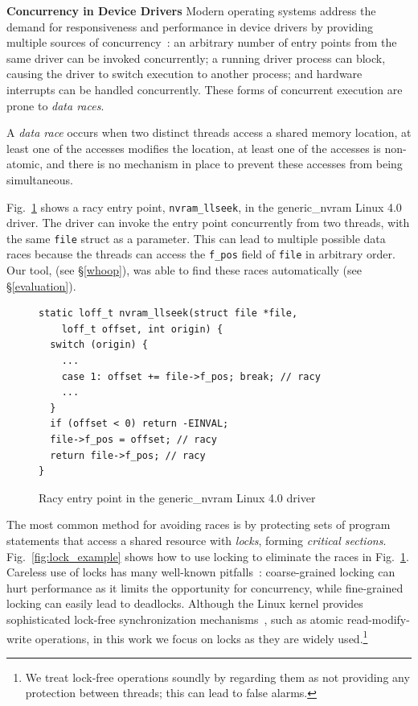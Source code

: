 \noindent\textbf{Concurrency in Device Drivers }
%
Modern operating systems address the demand for responsiveness and performance in device drivers by providing multiple sources of concurrency~\cite{corbet2005linux}: an arbitrary number of entry points from the same driver can be invoked concurrently; a running driver process can block, causing the driver to switch execution to another process; and hardware interrupts can be handled concurrently.  These forms of concurrent execution are prone to \emph{data races}.

\begin{definition}
\label{definition:datarace}
A \emph{data race} occurs when two distinct threads access a shared memory location, at least one of the accesses modifies the location, at least one of the accesses is non-atomic, and there is no mechanism in place to prevent these accesses from being simultaneous.
\end{definition}

Fig.~\ref{fig:data_race_example} shows a racy entry point, \texttt{nvram\_llseek}, in the generic\_nvram Linux 4.0 driver. The driver can invoke the entry point concurrently from two threads, with the same \texttt{file} struct as a parameter. This can lead to multiple possible data races because the threads can access the \texttt{f\_pos} field of \texttt{file} in arbitrary order. Our tool, \whoop (see \S\ref{whoop}), was able to find these races automatically (see \S\ref{evaluation}).

\begin{figure}[t]
\begin{lstlisting}
static loff_t nvram_llseek(struct file *file,
    loff_t offset, int origin) {
  switch (origin) {
    ...
    case 1: offset += file->f_pos; break; // racy
    ...
  }
  if (offset < 0) return -EINVAL;
  file->f_pos = offset; // racy
  return file->f_pos; // racy
}
\end{lstlisting}
\caption{Racy entry point in the generic\_nvram Linux 4.0 driver}
\label{fig:data_race_example}
\end{figure}

The most common method for avoiding races is by protecting sets of program statements that access a shared resource with \emph{locks}, forming \emph{critical sections}.  Fig.~\ref{fig:lock_example} shows how to use locking to eliminate the races in Fig.~\ref{fig:data_race_example}. 
%
Careless use of locks has many well-known pitfalls~\cite{sutter2005software}: coarse-grained locking can hurt performance as it limits the opportunity for concurrency, while fine-grained locking can easily lead to deadlocks. Although the Linux kernel provides sophisticated lock-free synchronization mechanisms~\cite[p.\ 123]{corbet2005linux}, such as atomic read-modify-write operations, in this work we focus on locks as they are widely used.\footnote{We treat lock-free operations soundly by regarding them as not providing any protection between threads; this can lead to false alarms.}

